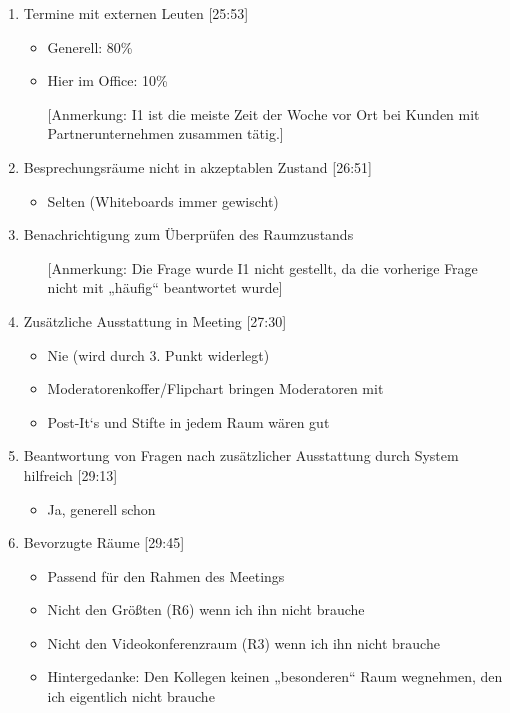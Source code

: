 \begin{enumerate}
        
    \item Termine mit externen Leuten [25:53]
    \begin{itemize}
        \item Generell: 80\%
        \item Hier im Office: 10\%
        \item[] [Anmerkung: I1 ist die meiste Zeit der Woche vor Ort bei Kunden mit Partnerunternehmen zusammen tätig.]
    \end{itemize}
    
    \item Besprechungsräume nicht in akzeptablen Zustand [26:51]
    \begin{itemize}
        \item Selten (Whiteboards immer gewischt)
    \end{itemize}

    \item Benachrichtigung zum Überprüfen des Raumzustands
    \begin{itemize}
        \item[] [Anmerkung: Die Frage wurde I1 nicht gestellt, da die vorherige Frage nicht mit „häufig“ beantwortet wurde]
    \end{itemize}
    
    \item Zusätzliche Ausstattung in Meeting [27:30]
    \begin{itemize}
        \item Nie (wird durch 3. Punkt widerlegt) 
        \item Moderatorenkoffer/Flipchart bringen Moderatoren mit
        \item Post-It‘s und Stifte in jedem Raum wären gut
    \end{itemize}

    \item Beantwortung von Fragen nach zusätzlicher Ausstattung durch System hilfreich [29:13]
    \begin{itemize}
        \item Ja, generell schon
    \end{itemize}
        
    \item Bevorzugte Räume [29:45]
    \begin{itemize}
        \item Passend für den Rahmen des Meetings
        \item Nicht den Größten (R6) wenn ich ihn nicht brauche
        \item Nicht den Videokonferenzraum (R3) wenn ich ihn nicht brauche
        \item Hintergedanke: Den Kollegen keinen „besonderen“ Raum wegnehmen, den ich eigentlich nicht brauche
    \end{itemize}
    

\end{enumerate}
